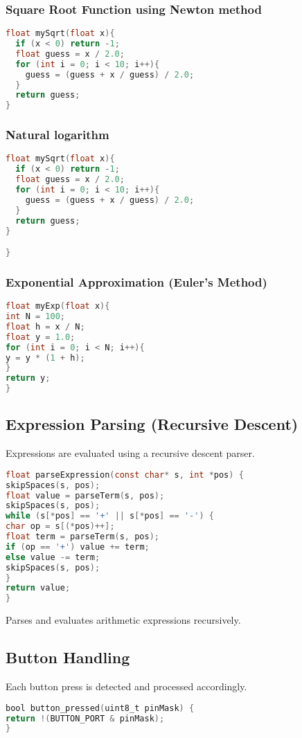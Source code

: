 \subsubsection{Square Root Function using Newton method}
\begin{lstlisting}[language=C]
float mySqrt(float x){
  if (x < 0) return -1;
  float guess = x / 2.0;
  for (int i = 0; i < 10; i++){
    guess = (guess + x / guess) / 2.0;
  }
  return guess;
}
\end{lstlisting}
\subsubsection{Natural logarithm}
\begin{lstlisting}[language=C]
float mySqrt(float x){
  if (x < 0) return -1;
  float guess = x / 2.0;
  for (int i = 0; i < 10; i++){
    guess = (guess + x / guess) / 2.0;
  }
  return guess;
}

}
\end{lstlisting}
\subsubsection{Exponential Approximation (Euler's Method)}
\begin{lstlisting}[language=C]
float myExp(float x){
int N = 100;
float h = x / N;
float y = 1.0;
for (int i = 0; i < N; i++){
y = y * (1 + h);
}
return y;
}
\end{lstlisting}

\subsection{Expression Parsing (Recursive Descent)}
Expressions are evaluated using a recursive descent parser.
\begin{lstlisting}[language=C]
float parseExpression(const char* s, int *pos) {
skipSpaces(s, pos);
float value = parseTerm(s, pos);
skipSpaces(s, pos);
while (s[*pos] == '+' || s[*pos] == '-') {
char op = s[(*pos)++];
float term = parseTerm(s, pos);
if (op == '+') value += term;
else value -= term;
skipSpaces(s, pos);
}
return value;
}
\end{lstlisting}

Parses and evaluates arithmetic expressions recursively.

\subsection{Button Handling}
Each button press is detected and processed accordingly.
\begin{lstlisting}[language=C]
bool button_pressed(uint8_t pinMask) {
return !(BUTTON_PORT & pinMask);
}
\end{lstlisting}

